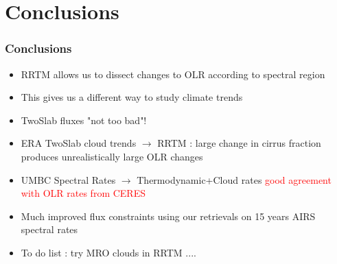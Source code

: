 \documentclass[10pt,t]{beamer}
\begin{document}
\section{Conclusions}
\begin{frame}
  \frametitle{Conclusions}
  \begin{itemize}
  \item RRTM allows us to dissect changes to OLR according to spectral region
  \item This gives us a different way to study climate trends
  \item TwoSlab fluxes "not too bad"!
  \item ERA TwoSlab cloud trends $\rightarrow$ RRTM : large change in cirrus fraction
        produces unrealistically large OLR changes
  \item UMBC Spectral Rates $\rightarrow$ Thermodynamic+Cloud rates \textcolor{red}{good agreement
        with OLR rates from CERES}
  \item Much improved flux constraints using our retrievals on 15 years AIRS spectral rates
  \item To do list : try MRO clouds in RRTM ....
  \end{itemize}
\end{frame}
\end{document}
